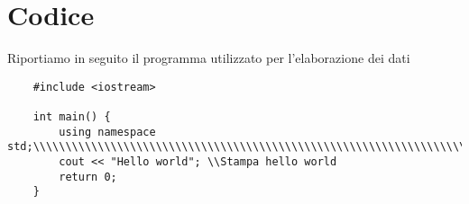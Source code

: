 \documentclass[12pt]{article} %
\begin{document}
\section{Codice}
	Riportiamo in seguito il programma utilizzato per l'elaborazione dei dati
	\begin{verbatim}
	#include <iostream>

	int main() {
		using namespace std;\\\\\\\\\\\\\\\\\\\\\\\\\\\\\\\\\\\\\\\\\\\\\\\\\\\\\\\\\\\\\\\\\\\\\\\\\\\\\\\\\\\\\\\\\\\\\\\\\\\\\
		cout << "Hello world"; \\Stampa hello world
		return 0;
	}
	\end{verbatim}
\end{document}
